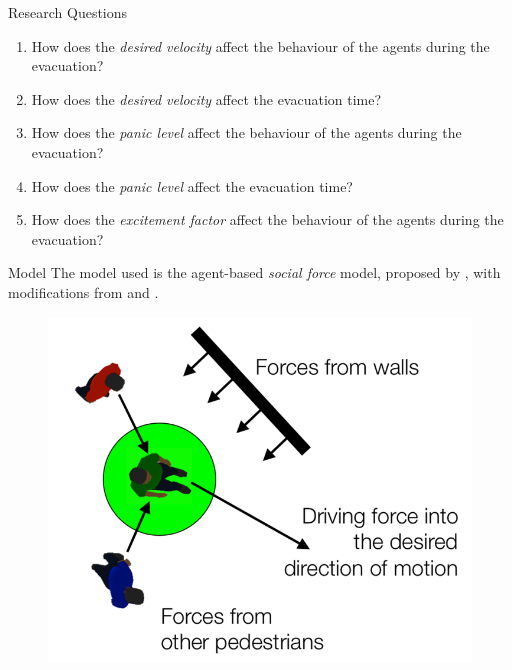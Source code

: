 \documentclass[aspectratio=43]{beamer}
\begin{document}
\begin{frame}{Research Questions}
	\begin{enumerate}
		\item How does the \emph{desired velocity} affect the behaviour of the agents during the evacuation? \\
		\smallskip
		\item How does the \emph{desired velocity} affect the evacuation time? \\
		\smallskip
		\item How does the \emph{panic level} affect the behaviour of the agents during the evacuation? \\
		\smallskip
		\item How does the \emph{panic level} affect the evacuation time? \\
		\smallskip
		\item How does the \emph{excitement factor} affect the behaviour of the agents during the evacuation?
	\end{enumerate}
\end{frame}


\begin{frame}{Model}
	The model used is the agent-based \emph{social force} model, proposed by \citet{Helbing2000}, with modifications from \cite{Zainuddin2010} and \cite{Wang2016}.
	
	\begin{figure}
		\includegraphics[width=0.6\linewidth]{social_force.png}
	\end{figure}
\end{frame}
\end{document}
